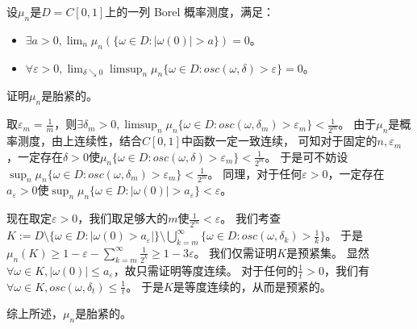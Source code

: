 \documentclass{ctexart}
\begin{document}
\begin{problem}\label{pro:1}
  设\(\mu_n \)是\(D=C[0,1] \)上的一列 Borel 概率测度，满足：
  \begin{itemize}
    \item \(\exists a > 0, \lim_{n} \mu_n(\{\omega \in D:|\omega(0)|>a\}) = 0 \)。
    \item \(\forall \varepsilon > 0, \lim_{\delta \searrow 0} \limsup_{n} \mu_n\{\omega \in D:osc(\omega,\delta)>\varepsilon\} = 0\)。
  \end{itemize}
  证明\(\mu_n \)是胎紧的。
\end{problem}
\begin{solution}
  取\(\varepsilon_m = \frac{1}{m} \)，则\(\exists \delta_m > 0, \limsup_{n} \mu_n\{\omega \in D:osc(\omega,\delta_m)>\varepsilon_m\} < \frac{1}{2^m}\)。
  由于\(\mu_n \)是概率测度，由上连续性，结合\(C[0,1] \)中函数一定一致连续，
  可知对于固定的\(n,\varepsilon_m \)，一定存在\(\delta>0 \)使\(\mu_n \{\omega \in D:osc(\omega,\delta)>\varepsilon_m\} < \frac{1}{2^m} \)。
  于是可不妨设\(\sup_{n} \mu_n\{\omega \in D:osc(\omega,\delta_m)>\varepsilon_m\} < \frac{1}{2^m} \)。
  同理，对于任何\(\varepsilon>0 \)，一定存在\(a_\varepsilon>0 \)使\(\sup_{n}\mu_n \{\omega \in D:|\omega(0)|>a_\varepsilon\} <\varepsilon \)。

  现在取定\(\varepsilon>0 \)，我们取足够大的\(m \)使\(\frac{1}{2^m}<\varepsilon \)。
  我们考查\(K:=D \setminus \{\omega \in D:|\omega(0)>a_\varepsilon|\} \setminus \bigcup_{k=m}^{\infty} \{\omega \in D: osc(\omega,\delta_k)> \frac{1}{k}\} \)。
  于是\(\mu_n(K) \geq 1-\varepsilon - \sum_{k=m}^{\infty} \frac{1}{2^k} \geq 1-3 \varepsilon \)。
  我们仅需证明\(K \)是预紧集。
  显然\(\forall \omega \in K,|\omega(0)| \leq a_\varepsilon \)，故只需证明等度连续。
  对于任何的\(\frac{1}{t}>0 \)，我们有\(\forall \omega \in K, osc(\omega,\delta_t) \leq \frac{1}{t} \)。
  于是\(K \)是等度连续的，从而是预紧的。

  综上所述，\(\mu_n \)是胎紧的。
\end{solution}
\end{document}
